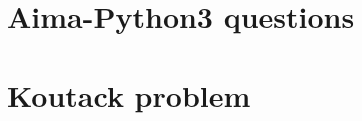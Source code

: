 

\usepackage{lipsum}




\tableofcontents
\thispagestyle{empty}	%
\newpage
{} %

\section{Aima-Python3 questions}

\newpage
\section{Koutack problem}




